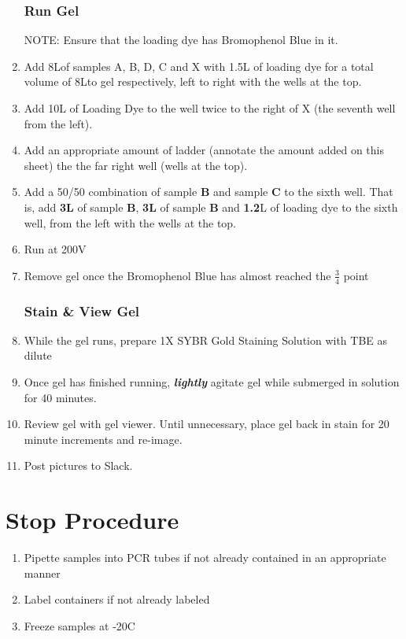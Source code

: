 \documentclass[letterpaper]{article}
\newcommand{\C}{\degree{}C}
\newcommand{\uL}{\micro{}L}
\begin{document}
\begin{enumerate}
\subsubsection{Run Gel}
NOTE: Ensure that the loading dye has Bromophenol Blue in it.
\item{Add 8\uL of samples A, B, D, C and X with 1.5\uL{} of loading dye for a total volume of 8\uL to gel respectively, left to right with the wells at the top.}
\item{Add 10\uL{} of Loading Dye to the well twice to the right of X (the seventh well from the left).}
\item{Add an appropriate amount of ladder (annotate the amount added on this sheet) the the far right well (wells at the top).}
\item{Add a 50/50 combination of sample \textbf{B} and sample \textbf{C} to the sixth well. That is, add \textbf{3\uL{}} of sample \textbf{B}, \textbf{3\uL{}} of sample \textbf{B} and \textbf{1.2}\uL{} of loading dye to the sixth well, from the left with the wells at the top.}
\item{Run at 200V}
\item{Remove gel once the Bromophenol Blue has almost reached the $\frac{3}{4}$ point \cite{dnaAgarose}}

\subsubsection{Stain \& View Gel}
\item{While the gel runs, prepare 1X SYBR Gold Staining Solution with TBE as dilute}
\item{Once gel has finished running, \textbf{\textit{lightly}} agitate gel while submerged in solution for 40 minutes.}
\item{Review gel with gel viewer. Until unnecessary, place gel back in stain for 20 minute increments and re-image.}
\item{Post pictures to Slack.}\\
\end{enumerate} 

\section*{Stop Procedure}
\begin{enumerate}
\item{Pipette samples into PCR tubes if not already contained in an appropriate manner}
\item{Label containers if not already labeled}
\item{Freeze samples at -20\C{}}
\end{enumerate}
\end{document}
